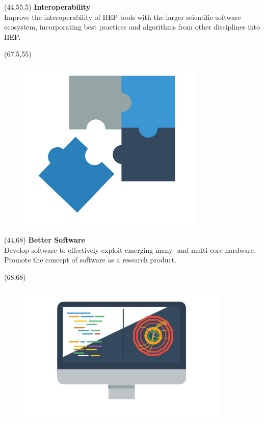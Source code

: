 \documentclass[final]{beamer}
\begin{document}
\begin{frame}{}

\begin{textblock}{22.5}(44,55.5)
\textcolor{mybluelabel}{\bf Interoperability} \\
Improve the interoperability of HEP tools with the larger scientific software ecosystem, incorporating best practices and algorithms from other disciplines into HEP.
\end{textblock}

\begin{textblock}{12.5}(67.5,55)
\begin{figure}[tbph]
\centering
\includegraphics[width=0.8\textwidth]{interoperable.jpg}
\end{figure}
\end{textblock}

\begin{textblock}{23}(44,68)
\textcolor{mybluelabel}{\bf Better Software} \\
Develop software to effectively exploit emerging many- and multi-core hardware. 
Promote the concept of software as a research product.
\end{textblock}

\begin{textblock}{12.0}(68,68)
\begin{figure}[tbph]
\centering
\includegraphics[width=0.9\textwidth]{better-software.jpg}
\end{figure}
\end{textblock}


\end{frame}
\end{document}
